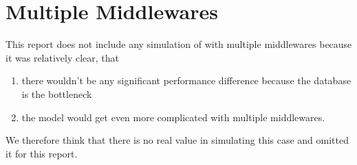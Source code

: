 \documentclass[a4paper, oneside]{csthesis}
\begin{document}
\section{Multiple Middlewares}
    This report does not include any simulation of \telesto{} with multiple
    middlewares because it was relatively clear, that 
    \begin{enumerate}
        \item there wouldn't be any significant performance difference because
        the database is the bottleneck
        \item the model would get even more complicated with multiple
        middlewares.
    \end{enumerate}
    
    We therefore think that there is no real value in simulating this case and
    omitted it for this report.
    





	
\end{document}
